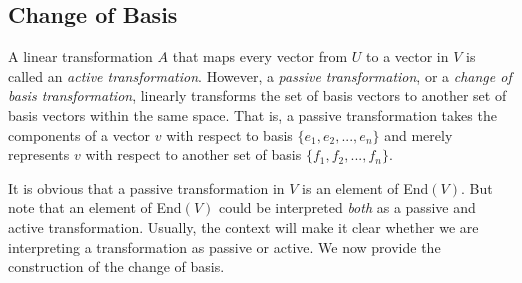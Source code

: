\documentclass{article}
\begin{document}
  \subsection{Change of Basis}

    \begin{definition}
      A linear transformation $A$ that maps every vector from $U$ to a vector in $V$ is called an \textit{active transformation}. However, a \textit{passive transformation}, or a \textit{change of basis transformation}, linearly transforms the set of basis vectors to another set of basis vectors within the same space. That is, a passive transformation takes the components of a vector $v$ with respect to basis $\{e_1, e_2, ..., e_n\}$ and merely represents $v$ with respect to another set of basis $\{f_1, f_2, ..., f_n\}$. 
    \end{definition}

    It is obvious that a passive transformation in $V$ is an element of End$(V)$. But note that an element of End$(V)$ could be interpreted \textit{both} as a passive and active transformation. Usually, the context will make it clear whether we are interpreting a transformation as passive or active. We now provide the construction of the change of basis. 
\end{document}
